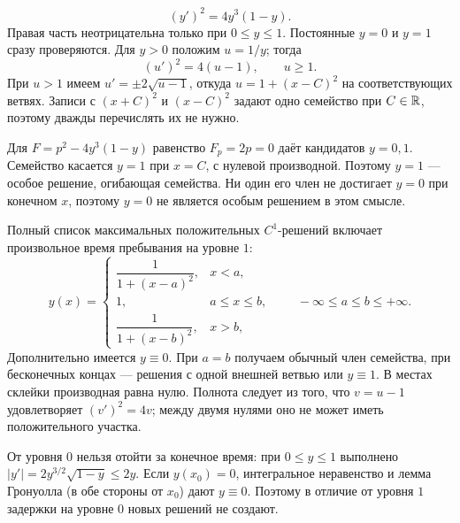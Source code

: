 \[
 (y')^2=4y^3(1-y).
\]
Правая часть неотрицательна только при $0\le y\le1$.
Постоянные $y=0$ и $y=1$ сразу проверяются.
Для $y>0$ положим $u=1/y$; тогда
\[
 (u')^2=4(u-1),\qquad u\ge1.
\]
При $u>1$ имеем $u'=\pm2\sqrt{u-1}$, откуда
$u=1+(x-C)^2$ на соответствующих ветвях.
Записи с $(x+C)^2$ и $(x-C)^2$ задают одно семейство при $C\in\mathbb{R}$,
поэтому дважды перечислять их не нужно.

Для $F=p^2-4y^3(1-y)$ равенство $F_p=2p=0$ даёт кандидатов $y=0,1$.
Семейство касается $y=1$ при $x=C$, с нулевой производной.
Поэтому $y=1$ --- особое решение, огибающая семейства.
Ни один его член не достигает $y=0$ при конечном $x$, поэтому
$y=0$ не является особым решением в этом смысле.

Полный список максимальных положительных $C^1$-решений включает
произвольное время пребывания на уровне $1$:
\[
 y(x)=\begin{cases}
 \dfrac1{1+(x-a)^2},&x<a,\\[2pt]
 1,&a\le x\le b,\\[2pt]
 \dfrac1{1+(x-b)^2},&x>b,
 \end{cases}\qquad -\infty\le a\le b\le+\infty.
\]
Дополнительно имеется $y\equiv0$. При $a=b$ получаем обычный член
семейства, при бесконечных концах --- решения с одной внешней ветвью
или $y\equiv1$. В местах склейки производная равна нулю.
Полнота следует из того, что $v=u-1$ удовлетворяет $(v')^2=4v$;
между двумя нулями оно не может иметь положительного участка.

От уровня $0$ нельзя отойти за конечное время: при $0\le y\le1$
выполнено $|y'|=2y^{3/2}\sqrt{1-y}\le2y$.
Если $y(x_0)=0$, интегральное неравенство и лемма Гронуолла
(в обе стороны от $x_0$) дают $y\equiv0$. Поэтому в отличие от
уровня $1$ задержки на уровне $0$ новых решений не создают.

\begin{center}
\end{center}
